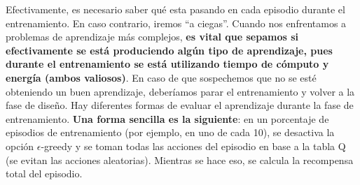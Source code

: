 \documentclass{article}
\begin{document}
 Efectivamente, es necesario saber qué esta pasando en cada episodio durante el entrenamiento. En caso contrario, iremos ``a ciegas''. Cuando nos enfrentamos a problemas de aprendizaje más complejos, \textbf{es vital que sepamos si efectivamente se está produciendo algún tipo de aprendizaje, pues durante el entrenamiento se está utilizando tiempo de cómputo y energía (ambos valiosos)}. En caso de que sospechemos que no se esté obteniendo un buen aprendizaje, deberíamos parar el entrenamiento y volver a la fase de diseño. Hay diferentes formas de evaluar el aprendizaje durante la fase de entrenamiento. \textbf{Una forma sencilla es la siguiente}: en un porcentaje de episodios de entrenamiento (por ejemplo, en uno de cada 10), se desactiva la opción $\epsilon$-greedy y se toman todas las acciones del episodio en base a la tabla Q (se evitan las acciones aleatorias). Mientras se hace eso, se calcula la recompensa total del episodio.
\end{document}
